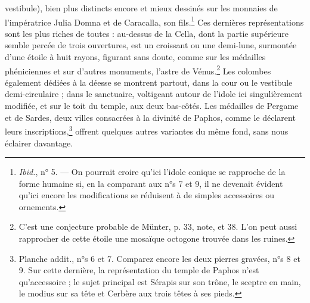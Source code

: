 \documentclass[a4paper, 11pt, oneside, polutonikogreek, french]{article}
\begin{document}
vestibule), bien plus distincts encore et mieux dessinés sur les monnaies de l'impératrice Julia Domna et de Caracalla, son fils.\footnote{\emph{Ibid.}, n° 5. --- On pourrait croire qu'ici l'idole conique se rapproche de la forme humaine si, en la comparant aux n°s 7 et 9, il ne devenait évident qu'ici encore les modifications se réduisent à de simples accessoires ou ornements.} Ces dernières représentations sont les plus riches de toutes : au-dessus de la Cella, dont la partie supérieure semble percée de trois ouvertures, est un croissant ou une demi-lune, surmontée d'une étoile à huit rayons, figurant sans doute, comme sur les médailles phéniciennes et sur d'autres monuments, l'astre de Vénus.\footnote{C'est une conjecture probable de Münter, p. 33, note, et 38. L'on peut aussi rapprocher de cette étoile une mosaïque octogone trouvée dans les ruines.} Les colombes également dédiées à la déesse se montrent partout, dans la cour ou le vestibule demi-circulaire ; dans le sanctuaire, voltigeant autour de l'idole ici singulièrement modifiée, et sur le toit du temple, aux deux bas-côtés. Les médailles de Pergame et de Sardes, deux villes consacrées à la divinité de Paphos, comme le déclarent leurs inscriptions,\footnote{Planche addit., n°s 6 et 7. Comparez encore les deux pierres gravées, n°s 8 et 9. Sur cette dernière, la représentation du temple de Paphos n'est qu'accessoire ; le sujet principal est Sérapis sur son trône, le sceptre en main, le modius sur sa tête et Cerbère aux trois têtes à ses pieds.} offrent quelques autres variantes du même fond, sans nous éclairer davantage.
\end{document}
